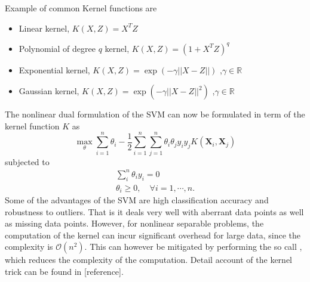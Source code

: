 \documentclass[../Main/thesis.tex]{subfiles}
\begin{document}
\justify
Example of common Kernel functions are 
\begin{itemize}
\item Linear kernel,  $K\left(X,Z\right) = X^{T}Z$
\item Polynomial of degree $q$ kernel, $K\left(X,Z\right) = \left(1+X^{T}Z\right)^{q}$ 
\item Exponential kernel,  $K(X,Z) = \exp\left(-\gamma ||X-Z||\right)$ ,$\gamma\in\mathbb{R}$
\item Gaussian kernel,  $K(X,Z) = \exp\left(-\gamma ||X-Z||^{2}\right)$ ,$\gamma\in\mathbb{R}$
\end{itemize}
The nonlinear dual formulation of the SVM can now be formulated in term of the kernel function $K$ as 
\begin{equation}
\max_{\theta}\sum_{i=1}^{n}\theta_{i} - \frac{1}{2}\sum_{i=1}^{n}\sum_{j=1}^{n}\theta_{i}\theta_{j}y_{i}y_{j}K\left(\bm{X}_{i},\bm{X}_{j}\right)
\end{equation}
subjected to 
\begin{equation}
\begin{split}
\sum_{i}^{n}\theta_{i}y_{i} = 0\\
\theta_{i} \geq 0, \quad \forall i = 1,\cdots,n.
\end{split}
\end{equation}
\justify
Some of the advantages of the SVM are high classification accuracy and robustness to outliers. That is it deals very well with aberrant data points as well as missing data points. However, for nonlinear separable problems, the computation of the kernel can incur significant overhead for large data, since the complexity is $\mathcal{O}\left(n^{2}\right)$. This can however be mitigated by performing the so call , which reduces the complexity of the computation. Detail account of the kernel trick can be found in [reference]. 
\end{document}
